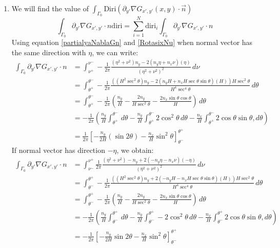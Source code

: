 \documentclass[a4paper,12pt]{article}
\newcommand{\integ}[3]{%
\ensuremath{\displaystyle{\int^{#2}_{#1} #3}}}
\begin{document}
\begin{enumerate}
\item We will find the value of $\integ{\Gamma_0}{}{\text{Diri}\left(\partial_{y'}\nabla G_{x',y'}(x,y)\cdot \vec{n}\right)}$
\[
  \integ{\Gamma_0}{}{\partial_{y'}\nabla G_{x',y'} \cdot n \text{diri}}=\sum\limits_{i=1}^N \text{diri}_i \integ{\Gamma_0}{}{\partial_{y'}\nabla G_{x',y'} \cdot n}
\]
Using equation \ref{partialyaNablaGn} and \ref{RotasixNu} when normal vector has the same direction with $\eta$, we can write:
\begin{align}
 \integ{\Gamma_0}{}{\partial_{y'}\nabla G_{x',y'} \cdot n}
 &= \integ{\nu^+}{\nu^-}{-\frac{1}{2\pi} \frac{(\eta^2+\nu^2)n_y-2(n_y\eta+n_x\nu)(\eta)}{(\eta^2+\nu^2)^2} \, d\nu}\\
&=\integ{\theta^+}{\theta^-}{-\frac{1}{2\pi} \frac{\left((H^2 \sec^2\theta)n_y-2(n_y H+n_x H \sec \theta \sin \theta)(H)\right)H \sec^2\theta}{H^4 \sec^4\theta} \, d\theta}\\
&= \integ{\theta^+}{\theta^-}{-\frac{1}{2\pi} \left( \frac{n_y}{H}-\frac{2n_y}{H \sec^2\theta}-\frac{2n_x \sin \theta \cos\theta}{H} \right) \, d\theta}\\
&= -\frac{1}{2\pi} \left(\frac{n_y}{H} \integ{\theta^+}{\theta^-}{\, d\theta}-
 \frac{n_y}{H} \integ{\theta^+}{\theta^-}{2\cos^2\theta \, d\theta}-
 \frac{n_x}{H} \integ{\theta^+}{\theta^-}{2\cos \theta \sin\theta, d\theta} \right)\\
&= \frac{1}{2\pi} \left[-\frac{n_y}{2H}\left(\sin2\theta\right)-\frac{n_x}{H}\sin^2\theta \right]_{\theta^-}^{\theta^+}\label{intPartialyaNablaGn1}
\end{align}
If normal vector has direction $-\eta$, we obtain:
\begin{align}
 \integ{\Gamma_0}{}{\partial_{y'}\nabla G_{x',y'} \cdot n}
 &= \integ{\nu^-}{\nu^+}{\frac{1}{2\pi} \frac{(\eta^2+\nu^2)-n_y+2(-n_y\eta-n_x\nu)(-\eta)}{(\eta^2+\nu^2)^2} \, d\nu}\\
&=\integ{\theta^-}{\theta^+}{-\frac{1}{2\pi} \frac{\left((H^2 \sec^2\theta)n_y+2(-n_y H-n_x H \sec \theta \sin \theta)(H)\right)H \sec^2\theta}{H^4 \sec^4\theta} \, d\theta}\\
&= \integ{\theta^-}{\theta^+}{-\frac{1}{2\pi} \left( \frac{n_y}{H}-\frac{2n_y}{H \sec^2\theta}-\frac{2n_x \sin \theta \cos\theta}{H} \right) \, d\theta}\\
&= -\frac{1}{2\pi} \left(\frac{n_y}{H} \integ{\theta^-}{\theta^+}{\, d\theta}-
 \frac{n_y}{H} \integ{\theta^-}{\theta^+}-{2\cos^2\theta \, d\theta}-
 \frac{n_x}{H} \integ{\theta^-}{\theta^+}{2\cos \theta \sin\theta, d\theta} \right)\\
&= -\frac{1}{2\pi} \left[-\frac{n_y}{2H} \sin2\theta-\frac{n_x}{H}\sin^2\theta \right]_{\theta^-}^{\theta^+}\label{intPartialyaNablaGn11}
\end{align}


\end{enumerate}
\end{document}
